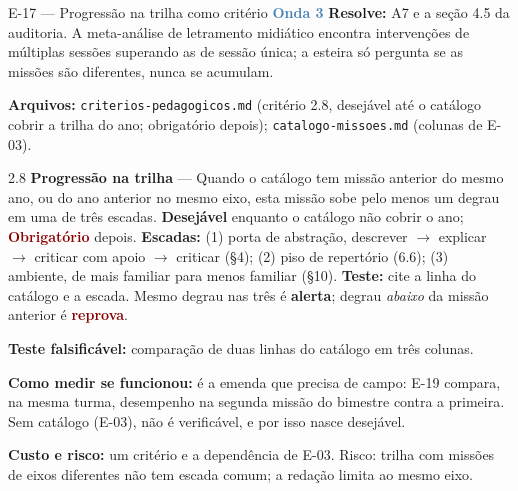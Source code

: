 \documentclass[11pt,a4paper]{article}
\newcommand{\obrig}{\textcolor{DarkRed}{\textbf{Obrigatório}}}
\newcommand{\desej}{\textcolor{DarkYellow}{\textbf{Desejável}}}
\newcommand{\rep}{\textcolor{DarkRed}{\textbf{reprova}}}
\newcommand{\alerta}{\textcolor{DarkYellow}{\textbf{alerta}}}
\newcommand{\onda}[1]{\textcolor{SteelBlue}{\textbf{Onda #1}}}
\begin{document}
\begin{emendabox}{E-17 --- Progressão na trilha como critério \hfill \onda{3}}
\textbf{Resolve:} A7 e a seção 4.5 da auditoria. A meta-análise de letramento midiático
\cite{huang2024} encontra intervenções de múltiplas sessões superando as de sessão única; a
esteira só pergunta se as missões são diferentes, nunca se acumulam.

\textbf{Arquivos:} \texttt{criterios-pedagogicos.md} (critério 2.8, desejável até o catálogo cobrir
a trilha do ano; obrigatório depois); \texttt{catalogo-missoes.md} (colunas de E-03).

\begin{depoisbox}\small
2.8 \textbf{Progressão na trilha} --- Quando o catálogo tem missão anterior do mesmo ano, ou do
ano anterior no mesmo eixo, esta missão sobe pelo menos um degrau em uma de três escadas.
\desej{} enquanto o catálogo não cobrir o ano; \obrig{} depois. \textbf{Escadas:} (1) porta de
abstração, descrever $\to$ explicar $\to$ criticar com apoio $\to$ criticar (\S4); (2) piso de
repertório (6.6); (3) ambiente, de mais familiar para menos familiar (\S10). \textbf{Teste:} cite
a linha do catálogo e a escada. Mesmo degrau nas três é \alerta; degrau \emph{abaixo} da missão
anterior é \rep.
\end{depoisbox}

\textbf{Teste falsificável:} comparação de duas linhas do catálogo em três colunas.

\textbf{Como medir se funcionou:} é a emenda que precisa de campo: E-19 compara, na mesma turma,
desempenho na segunda missão do bimestre contra a primeira. Sem catálogo (E-03), não é
verificável, e por isso nasce desejável.

\textbf{Custo e risco:} um critério e a dependência de E-03. Risco: trilha com missões de eixos
diferentes não tem escada comum; a redação limita ao mesmo eixo.
\end{emendabox}
\end{document}

